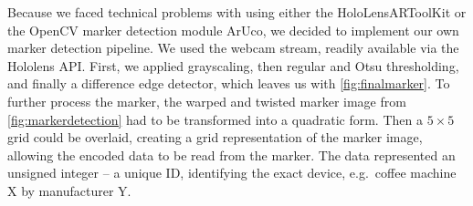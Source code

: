 Because we faced technical problems with using either the HoloLensARToolKit \cite{artoolkit}  or the OpenCV marker detection module ArUco, we decided to implement our own marker detection pipeline.
We used the webcam stream, readily available via the Hololens API.
First, we applied grayscaling, then regular and Otsu thresholding, and finally a difference edge detector, which leaves us with \autoref{fig:finalmarker}.
To further process the marker, the warped and twisted marker image from \autoref{fig:markerdetection} had to be transformed into a quadratic form.
Then a $5\times5$ grid could be overlaid, creating a grid representation of the marker image, allowing the encoded data to be read from the marker.
The data represented an unsigned integer -- a unique ID, identifying the exact device, e.g.\ coffee machine X by manufacturer Y.


